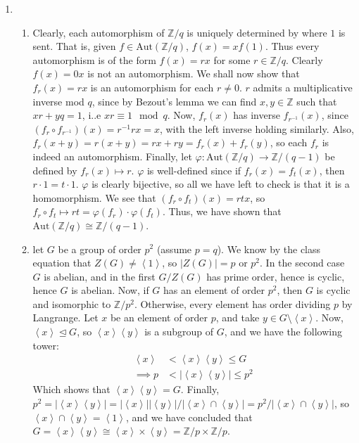 \documentclass[12pt]{article}
\theoremstyle{definitionstyle}
\def\mbb#1{\mathbb{#1}}
\def \cph{\varphi}
\newcommand{\Z}{\mbb Z}
\newcommand{\gen}[1]{\left\langle #1 \right\rangle}
\newcommand{\nsg}{\trianglelefteq}
\newcommand{\Aut}{\mathrm{Aut}}
\begin{document}
\begin{enumerate}[leftmargin=\labelsep]
		\item
		\begin{enumerate}[label=(\arabic*)]
			\item Clearly, each automorphism of $\Z/q$ is uniquely determined by where $1$ is sent. That is, given $f \in \Aut(\Z/q)$, $f(x) = xf(1)$. Thus every automorphism is of the form $f(x) = rx$ for some $r \in \Z/q$. Clearly $f(x) = 0x$ is not an automorphism. We shall now show that $f_r(x) = rx$ is an automorphism for each $r \neq 0$. $r$ admits a multiplicative inverse mod $q$, since by Bezout's lemma we can find $x, y \in \Z$ such that $xr + yq = 1$, i..e $xr \equiv 1 \mod q$. Now, $f_r(x)$ has inverse $f_{r^{-1}}(x)$, since $(f_r \circ f_{r^{-1}})(x) = r^{-1}r x = x$, with the left inverse holding similarly. Also, $f_r(x+y) = r(x+y) = rx + ry = f_r(x) + f_r(y)$, so each $f_r$ is indeed an automorphism. Finally, let $\cph: \Aut(\Z/q) \to \Z/(q-1)$ be defined by $f_r(x) \mapsto r$. $\cph$ is well-defined since if $f_r(x) = f_t(x)$, then $r \cdot 1 = t \cdot 1$. $\cph$ is clearly bijective, so all we have left to check is that it is a homomorphism. We see that $(f_r \circ f_t)(x) = rtx$, so $f_r \circ f_t \mapsto rt = \cph(f_r) \cdot \cph(f_t)$. Thus, we have shown that $\Aut(\Z/q) \cong \Z/(q-1)$.
			
			\item let $G$ be a group of order $p^2$ (assume $p = q$). We know by the class equation that $Z(G) \neq \gen{1}$, so $|Z(G)| = p$ or $p^2$. In the second case $G$ is abelian, and in the first $G/Z(G)$ has prime order, hence is cyclic, hence $G$ is abelian. Now, if $G$ has an element of order $p^2$, then $G$ is cyclic and isomorphic to $\Z/p^2$. Otherwise, every element has order dividing $p$ by Langrange. Let $x$ be an element of order $p$, and take $y \in G \setminus \gen{x}$. Now, $\gen{x} \nsg G$, so $\gen{x} \gen{y}$ is a subgroup of $G$, and we have the following tower:
			\begin{align*}
				\gen{x} &< \gen{x}\gen{y} \leq G
				\\ \implies p &< |\gen{x}\gen{y}| \leq p^2
			\end{align*}
			Which shows that $\gen{x}\gen{y} = G$. Finally, $p^2 = |\gen{x}\gen{y}| = |\gen{x}||\gen{y}| / |\gen{x} \cap \gen{y}| = p^2 / |\gen{x} \cap \gen{y}|$, so $\gen{x} \cap \gen{y} = \gen{1}$, and we have concluded that $G = \gen{x}\gen{y} \cong \gen{x} \times \gen{y} = \Z/p \times \Z/p$.
			

\end{enumerate}
\end{enumerate}
\end{document}
